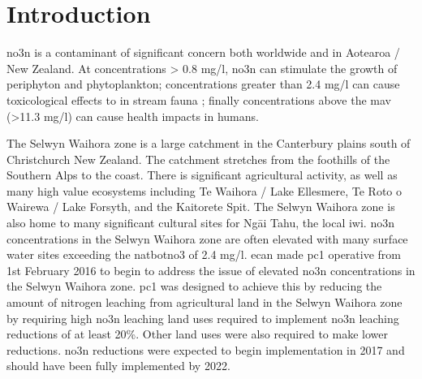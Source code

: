 
\section[Introduction]{Introduction} \label{sec:intro}

\gls{no3n} is a contaminant of significant concern both worldwide and in Aotearoa / New Zealand.
At concentrations > 0.8 mg/l, \gls{no3n} can stimulate the growth of periphyton and phytoplankton\citep{mcdowell_global_2020}; concentrations greater than 2.4 mg/l can cause toxicological effects to in stream fauna
\citep{camargo_nitrate_2005, horak_assessing_2019,wagenhoff_identifying_2017};
finally concentrations above the \gls{mav} (>11.3 mg/l) can cause health impacts in humans\citep{rahman_anthropogenic_2021}.

The Selwyn Waihora zone is a large catchment in the Canterbury plains south of Christchurch New Zealand. The catchment stretches from the foothills of the Southern Alps to the coast. There is significant agricultural activity, as well as many high value ecosystems including Te Waihora / Lake Ellesmere, Te Roto o Wairewa / Lake Forsyth, and the Kaitorete Spit. The Selwyn Waihora zone is also home to many significant cultural sites for Ngāi Tahu, the local iwi. \gls{no3n} concentrations in the Selwyn Waihora zone are often elevated with many surface water sites exceeding the \gls{natbotno3} of 2.4 mg/l\citep{noauthor_national_2020}. \gls{ecan} made \gls{pc1} operative from 1st February 2016 to begin to address the issue of elevated \gls{no3n} concentrations in the Selwyn Waihora zone. \gls{pc1} was designed to achieve this by reducing the amount of nitrogen leaching from agricultural land in the Selwyn Waihora zone by requiring high \gls{no3n} leaching land uses required to implement \gls{no3n} leaching reductions of at least 20\%. Other land uses were also required to make lower reductions. \gls{no3n} reductions were expected to begin implementation in 2017 and should have been fully implemented by 2022.

